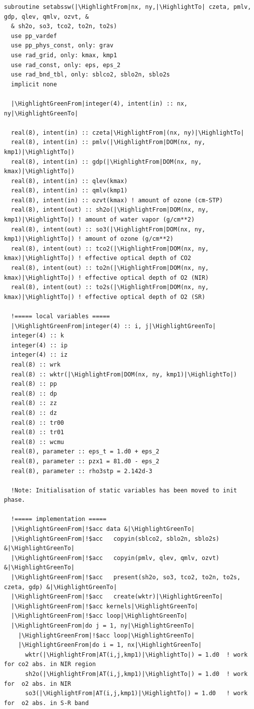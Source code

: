 \begin{lstlisting}[firstnumber=1, name=absswOpenACC, label=listing:absswOpenACC, caption={Example ASUCA kernel subroutine in OpenACC}, escapechar=|]
subroutine setabssw(|\HighlightFrom|nx, ny,|\HighlightTo| czeta, pmlv, gdp, qlev, qmlv, ozvt, &
  & sh2o, so3, tco2, to2n, to2s)
  use pp_vardef
  use pp_phys_const, only: grav
  use rad_grid, only: kmax, kmp1
  use rad_const, only: eps, eps_2
  use rad_bnd_tbl, only: sblco2, sblo2n, sblo2s
  implicit none

  |\HighlightGreenFrom|integer(4), intent(in) :: nx, ny|\HighlightGreenTo|

  real(8), intent(in) :: czeta|\HighlightFrom|(nx, ny)|\HighlightTo|
  real(8), intent(in) :: pmlv(|\HighlightFrom|DOM(nx, ny, kmp1)|\HighlightTo|)
  real(8), intent(in) :: gdp(|\HighlightFrom|DOM(nx, ny, kmax)|\HighlightTo|)
  real(8), intent(in) :: qlev(kmax)
  real(8), intent(in) :: qmlv(kmp1)
  real(8), intent(in) :: ozvt(kmax) ! amount of ozone (cm-STP)
  real(8), intent(out) :: sh2o(|\HighlightFrom|DOM(nx, ny, kmp1)|\HighlightTo|) ! amount of water vapor (g/cm**2)
  real(8), intent(out) :: so3(|\HighlightFrom|DOM(nx, ny, kmp1)|\HighlightTo|) ! amount of ozone (g/cm**2)
  real(8), intent(out) :: tco2(|\HighlightFrom|DOM(nx, ny, kmax)|\HighlightTo|) ! effective optical depth of CO2
  real(8), intent(out) :: to2n(|\HighlightFrom|DOM(nx, ny, kmax)|\HighlightTo|) ! effective optical depth of O2 (NIR)
  real(8), intent(out) :: to2s(|\HighlightFrom|DOM(nx, ny, kmax)|\HighlightTo|) ! effective optical depth of O2 (SR)

  !===== local variables =====
  |\HighlightGreenFrom|integer(4) :: i, j|\HighlightGreenTo|
  integer(4) :: k
  integer(4) :: ip
  integer(4) :: iz
  real(8) :: wrk
  real(8) :: wktr(|\HighlightFrom|DOM(nx, ny, kmp1)|\HighlightTo|)
  real(8) :: pp
  real(8) :: dp
  real(8) :: zz
  real(8) :: dz
  real(8) :: tr00
  real(8) :: tr01
  real(8) :: wcmu
  real(8), parameter :: eps_t = 1.d0 + eps_2
  real(8), parameter :: pzx1 = 81.d0 - eps_2
  real(8), parameter :: rho3stp = 2.142d-3
  
  !Note: Initialisation of static variables has been moved to init phase.
  
  !===== implementation =====
  |\HighlightGreenFrom|!$acc data &|\HighlightGreenTo|
  |\HighlightGreenFrom|!$acc   copyin(sblco2, sblo2n, sblo2s) &|\HighlightGreenTo|
  |\HighlightGreenFrom|!$acc   copyin(pmlv, qlev, qmlv, ozvt) &|\HighlightGreenTo|
  |\HighlightGreenFrom|!$acc   present(sh2o, so3, tco2, to2n, to2s, czeta, gdp) &|\HighlightGreenTo|
  |\HighlightGreenFrom|!$acc   create(wktr)|\HighlightGreenTo|
  |\HighlightGreenFrom|!$acc kernels|\HighlightGreenTo|
  |\HighlightGreenFrom|!$acc loop|\HighlightGreenTo|
  |\HighlightGreenFrom|do j = 1, ny|\HighlightGreenTo|
    |\HighlightGreenFrom|!$acc loop|\HighlightGreenTo|
    |\HighlightGreenFrom|do i = 1, nx|\HighlightGreenTo|
      wktr(|\HighlightFrom|AT(i,j,kmp1)|\HighlightTo|) = 1.d0  ! work for co2 abs. in NIR region
      sh2o(|\HighlightFrom|AT(i,j,kmp1)|\HighlightTo|) = 1.d0  ! work for  o2 abs. in NIR
      so3(|\HighlightFrom|AT(i,j,kmp1)|\HighlightTo|) = 1.d0   ! work for  o2 abs. in S-R band
      

\end{lstlisting}
